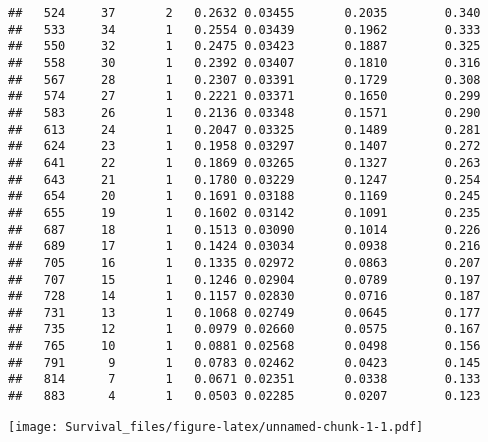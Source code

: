 \documentclass[]{article}
\newenvironment{Shaded}{\begin{snugshade}}{\end{snugshade}}
\newcommand{\KeywordTok}[1]{\textcolor[rgb]{0.13,0.29,0.53}{\textbf{#1}}}
\newcommand{\DataTypeTok}[1]{\textcolor[rgb]{0.13,0.29,0.53}{#1}}
\newcommand{\DecValTok}[1]{\textcolor[rgb]{0.00,0.00,0.81}{#1}}
\newcommand{\StringTok}[1]{\textcolor[rgb]{0.31,0.60,0.02}{#1}}
\newcommand{\NormalTok}[1]{#1}
\begin{document}
\begin{verbatim}
##   524     37       2   0.2632 0.03455       0.2035        0.340
##   533     34       1   0.2554 0.03439       0.1962        0.333
##   550     32       1   0.2475 0.03423       0.1887        0.325
##   558     30       1   0.2392 0.03407       0.1810        0.316
##   567     28       1   0.2307 0.03391       0.1729        0.308
##   574     27       1   0.2221 0.03371       0.1650        0.299
##   583     26       1   0.2136 0.03348       0.1571        0.290
##   613     24       1   0.2047 0.03325       0.1489        0.281
##   624     23       1   0.1958 0.03297       0.1407        0.272
##   641     22       1   0.1869 0.03265       0.1327        0.263
##   643     21       1   0.1780 0.03229       0.1247        0.254
##   654     20       1   0.1691 0.03188       0.1169        0.245
##   655     19       1   0.1602 0.03142       0.1091        0.235
##   687     18       1   0.1513 0.03090       0.1014        0.226
##   689     17       1   0.1424 0.03034       0.0938        0.216
##   705     16       1   0.1335 0.02972       0.0863        0.207
##   707     15       1   0.1246 0.02904       0.0789        0.197
##   728     14       1   0.1157 0.02830       0.0716        0.187
##   731     13       1   0.1068 0.02749       0.0645        0.177
##   735     12       1   0.0979 0.02660       0.0575        0.167
##   765     10       1   0.0881 0.02568       0.0498        0.156
##   791      9       1   0.0783 0.02462       0.0423        0.145
##   814      7       1   0.0671 0.02351       0.0338        0.133
##   883      4       1   0.0503 0.02285       0.0207        0.123
\end{verbatim}

\begin{Shaded}
\end{Shaded}

\texttt{[image: Survival\_files/figure-latex/unnamed-chunk-1-1.pdf]}
\end{document}
